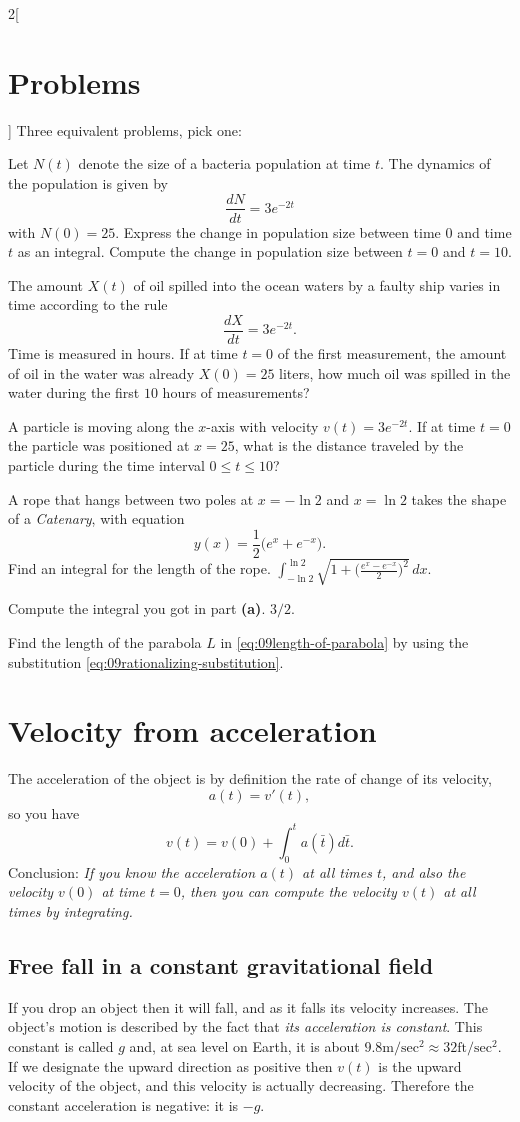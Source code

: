 \begin{multicols}{2}[
\section{Problems} %
\problemfont %
]
\problem Three equivalent problems, pick one: %

\subprob  Let $N(t)$ denote the size of a bacteria population at time $t$.  The
dynamics of the population is given by
\[
  \frac{dN}{dt}=3e^{-2t}
\]
with $N(0)=25$. Express the change in population size between time $0$ and time
$t$ as an integral.  Compute the change in population size between $t=0$ and
$t=10$.

\subprob  The amount $X(t)$ of oil spilled into the ocean waters by a faulty
ship varies in time according to the rule
\[
  \frac{dX}{dt}=3e^{-2t}.
\]
Time is measured in hours. If at time $t=0$ of the first measurement, the amount
of oil in the water was already $X(0)=25$ liters, how much oil was spilled in the
water during the first $10$ hours of measurements?

\subprob  A particle is moving along the $x$-axis with velocity $v(t)=3e^{-2t}$.
If at time $t=0$ the particle was positioned at $x=25$, what is the distance
traveled by the particle during the time interval $0 \leq t \leq 10$?

\problem A rope that hangs between two poles at $x=-\ln 2$ and $x=\ln 2$ takes %
the shape of a \textit{Catenary}, with equation
\[
  y(x)=\frac{1}{2}\bigl(e^x+e^{-x}\bigr).
\]
\subprob Find an integral for the length of the rope.
\answer%
$\displaystyle \int_{-\ln 2}^{\ln 2} \sqrt{1+\bigl(\frac{e^x-e^{-x}}{2}\bigr)^2}\, dx$.
\endanswer

\subprob Compute the integral you got in part \textbf{(a)}.
\answer%
$3/2$.
\endanswer

\problem \label{ex:09length-of-parabola} %
Find the length of the parabola $L$ in \eqref{eq:09length-of-parabola}
by using the substitution \eqref{eq:09rationalizing-substitution}.
\end{multicols}
\noproblemfont
\section{Velocity from acceleration} %
The acceleration of the object is by definition the rate of change of its
velocity,
\[
a(t) = v'(t),
\]
so you have
\[
v(t) = v(0) + \int_{0}^{t} a(\bar t)d\bar t .
\]
Conclusion: \textit{If you know the acceleration $a(t)$ at all times $t$, and
  also the velocity $v(0)$ at time $t=0$, then you can compute the velocity
  $v(t)$ at all times by integrating.}

\subsection{Free fall in a constant gravitational field} %
If you drop an object then it will fall, and as it falls its velocity increases.
The object's motion is described by the fact that \textit{its acceleration is
constant}.  This constant is called $g$ and, at sea level on Earth, it is about $9.8
\textrm{m}/\textrm{sec}^2 \approx 32\textrm{ft}/\textrm{sec}^2$.  If we
designate the upward direction as positive then $v(t)$ is the upward velocity of
the object, and this velocity is actually decreasing.  Therefore the constant
acceleration is negative: it is $-g$.

